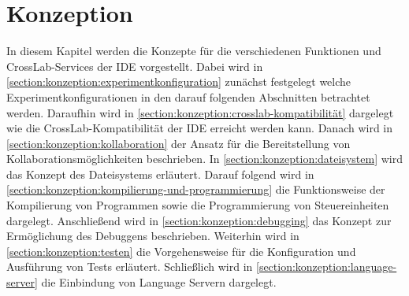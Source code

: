 \chapter{Konzeption}\label{section:konzeption}

In diesem Kapitel werden die Konzepte für die verschiedenen Funktionen und CrossLab-Services der IDE vorgestellt. Dabei wird in \autoref{section:konzeption:experimentkonfiguration} zunächst festgelegt welche Experimentkonfigurationen in den darauf folgenden Abschnitten betrachtet werden. Daraufhin wird in \autoref{section:konzeption:crosslab-kompatibilität} dargelegt wie die CrossLab-Kompatibilität der IDE erreicht werden kann. Danach wird in \autoref{section:konzeption:kollaboration} der Ansatz für die Bereitstellung von Kollaborationsmöglichkeiten beschrieben. In \autoref{section:konzeption:dateisystem} wird das Konzept des Dateisystems erläutert. Darauf folgend wird in \autoref{section:konzeption:kompilierung-und-programmierung} die Funktionsweise der Kompilierung von Programmen sowie die Programmierung von Steuereinheiten dargelegt. Anschließend wird in \autoref{section:konzeption:debugging} das Konzept zur Ermöglichung des Debuggens beschrieben. Weiterhin wird in \autoref{section:konzeption:testen} die Vorgehensweise für die Konfiguration und Ausführung von Tests erläutert. Schließlich wird in \autoref{section:konzeption:language-server} die Einbindung von Language Servern dargelegt.








